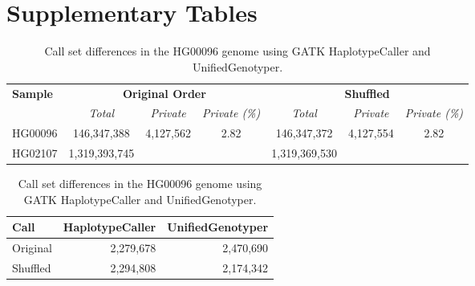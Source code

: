 


\newpage
\section{Supplementary Tables}
\setcounter{table}{0}
\setcounter{page}{1}

\renewcommand{\tablename}{Supplementary Table}


\begin{table}[htb]
\begin{center}
\begin{tabular}{|l|c|c|c||c|c|c|}
\hline
{\bf Sample} & \multicolumn{3}{c||}{\bf Original Order} & \multicolumn{3}{c|}{\bf Shuffled}\\
\cline{2-7}
{\bf } & {\it Total} & {\it Private} & {\it Private (\%)} 
& {\it Total} & {\it Private} & {\it Private (\%)} \\
\hline
HG00096 & 146,347,388 & 4,127,562 & 2.82 & 146,347,372 & 4,127,554 & 2.82\\
HG02107 & 1,319,393,745 & & & 1,319,369,530 & &  \\
\hline
\end{tabular}
\end{center}
\caption{Call set differences in the HG00096 genome using GATK HaplotypeCaller and UnifiedGenotyper.
}
\label{supptab:bwa-map}
\end{table}

\begin{table}[htb]
\begin{center}
\begin{tabular}{|l|r|r|}
\hline
{\bf Call} & {\bf HaplotypeCaller} & {\bf UnifiedGenotyper}\\
\hline
Original & 2,279,678 & 2,470,690\\
Shuffled & 2,294,808 & 2,174,342 \\
\hline
\end{tabular}
\end{center}
\caption{Call set differences in the HG00096 genome using GATK HaplotypeCaller and UnifiedGenotyper.
}
\label{supptab:gatk-orig-shuf-lowcov}
\end{table}


